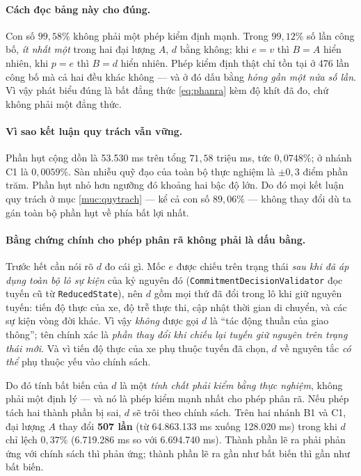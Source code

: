 \paragraph{Cách đọc bảng này cho đúng.} Con số $99{,}58\%$ không phải một phép kiểm định mạnh.
Trong $99{,}12\%$ số lần công bố, \emph{ít nhất một} trong hai đại lượng $A$, $d$ bằng không;
khi $e = v$ thì $B = A$ hiển nhiên, khi $p = e$ thì $B = d$ hiển nhiên. Phép kiểm định thật chỉ
tồn tại ở 476 lần công bố mà cả hai đều khác không --- và ở đó dấu bằng \emph{hỏng gần một nửa
số lần}. Vì vậy phát biểu đúng là bất đẳng thức \eqref{eq:phanra} kèm độ khít đã đo, chứ không
phải một đẳng thức.

\paragraph{Vì sao kết luận quy trách vẫn vững.} Phần hụt cộng dồn là 53.530 ms trên tổng
$71{,}58$ triệu ms, tức $0{,}0748\%$; ở nhánh C1 là $0{,}0059\%$. Sàn nhiễu quỹ đạo của toàn bộ
thực nghiệm là $\pm 0{,}3$ điểm phần trăm. Phần hụt nhỏ hơn ngưỡng đó khoảng hai bậc độ lớn. Do
đó mọi kết luận quy trách ở mục \ref{muc:quytrach} --- kể cả con số $89{,}06\%$ --- không thay
đổi dù ta gán toàn bộ phần hụt về phía bất lợi nhất.

\paragraph{Bằng chứng chính cho phép phân rã không phải là dấu bằng.} Trước hết cần nói rõ $d$
đo cái gì. Mốc $e$ được chiếu trên trạng thái \emph{sau khi đã áp dụng toàn bộ lô sự kiện} của
kỷ nguyên đó (\texttt{CommitmentDecisionValidator} đọc tuyến cũ từ \texttt{ReducedState}), nên
$d$ gồm mọi thứ đã đổi trong lô khi giữ nguyên tuyến: tiến độ thực của xe, độ trễ thực thi, cập
nhật thời gian di chuyển, và các sự kiện vòng đời khác. Vì vậy \emph{không} được gọi $d$ là
``tác động thuần của giao thông''; tên chính xác là \emph{phần thay đổi khi chiếu lại tuyến giữ
nguyên trên trạng thái mới}. Và vì tiến độ thực của xe phụ thuộc tuyến đã chọn, $d$ về nguyên
tắc \emph{có thể} phụ thuộc yếu vào chính sách.

Do đó tính bất biến của $d$ là một \emph{tính chất phải kiểm bằng thực nghiệm}, không phải một
định lý --- và nó là phép kiểm mạnh nhất cho phép phân rã. Nếu phép tách hai thành phần bị sai,
$d$ sẽ trôi theo chính sách. Trên hai nhánh B1 và C1, đại lượng $A$ thay đổi \textbf{507 lần}
(từ 64.863.133 ms xuống 128.020 ms) trong khi $d$ chỉ lệch \textbf{$0{,}37\%$} (6.719.286 ms so
với 6.694.740 ms). Thành phần lẽ ra phải phản ứng với chính sách thì phản ứng; thành phần lẽ ra
gần như bất biến thì gần như bất biến.

